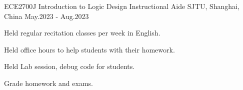 \begin{cventries}
  
  \cventry
  {ECE2700J Introduction to Logic Design}
  {Instructional Aide}
  {SJTU, Shanghai, China}
  {May.2023 - Aug.2023}
  {
    \begin{cvitems}
      \item {Held regular recitation classes per week in English.}
      \item {Held office hours to help students with their homework.}
      \item {Held Lab session, debug code for students.}
      \item {Grade homework and exams.}
    \end{cvitems}
  }






\end{cventries}









